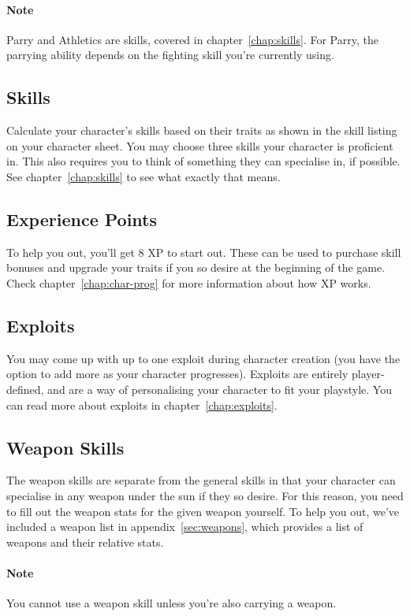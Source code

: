 \paragraph{Note} Parry and Athletics are skills, covered in chapter~\ref{chap:skills}.
For Parry, the parrying ability depends on the fighting skill you're currently using.

\subsection{Skills}
Calculate your character's skills based on their traits as shown in the skill listing on your character sheet.
You may choose three skills your character is proficient in.
This also requires you to think of something they can specialise in, if possible.
See chapter~\ref{chap:skills} to see what exactly that means.


\subsection{Experience Points}
To help you out, you'll get 8 XP to start out.
These can be used to purchase skill bonuses and upgrade your traits if you so desire at the beginning of the game.
Check chapter~\ref{chap:char-prog} for more information about how XP works.

\subsection{Exploits}
You may come up with up to one exploit during character creation (you have the option to add more as your character progresses).
Exploits are entirely player-defined, and are a way of personalising your character to fit your playstyle.
You can read more about exploits in chapter~\ref{chap:exploits}.

\subsection{Weapon Skills}
The weapon skills are separate from the general skills in that your character can specialise in any weapon under the sun if they so desire.
For this reason, you need to fill out the weapon stats for the given weapon yourself.
To help you out, we've included a weapon list in appendix~\ref{sec:weapons}, which provides a list of weapons and their relative stats.

\paragraph{Note} You cannot use a weapon skill unless you're also carrying a weapon.

